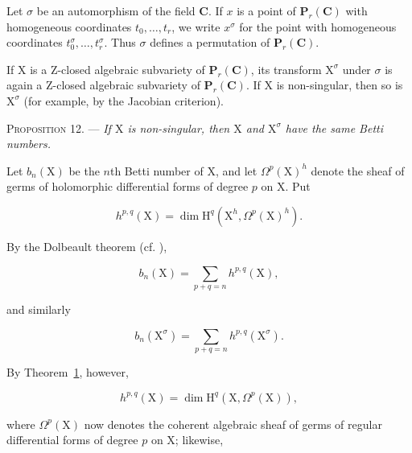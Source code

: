 

Let $\sigma$ be an automorphism of the field $\mathbf{C}$. If $x$ is a point of
$\mathbf{P}_r(\mathbf{C})$ with homogeneous coordinates $t_0,\ldots,t_r$, we
write $x^\sigma$ for the point with homogeneous coordinates
$t_0^\sigma,\ldots,t_r^\sigma$. Thus $\sigma$ defines a permutation of
$\mathbf{P}_r(\mathbf{C})$.

If $\mathrm{X}$ is a Z-closed algebraic subvariety of $\mathbf{P}_r(\mathbf{C})$, its
transform $\mathrm{X}^\sigma$ under $\sigma$ is again a Z-closed algebraic subvariety of
$\mathbf{P}_r(\mathbf{C})$. If $\mathrm{X}$ is non-singular, then so is $\mathrm{X}^\sigma$ (for
example, by the Jacobian criterion).

\textsc{Proposition 12}. --- \emph{If $\mathrm{X}$ is
non-singular, then $\mathrm{X}$ and $\mathrm{X}^\sigma$ have the same Betti numbers.}

Let $b_n(\mathrm{X})$ be the $n$th Betti number of $\mathrm{X}$, and let $\Omega^p(\mathrm{X})^h$ denote
the sheaf of germs of holomorphic differential forms of degree $p$ on $\mathrm{X}$.
Put

\begin{equation*}
h^{p,q}(\mathrm{X})=\dim\mathrm{H}^q(\mathrm{X}^h,\Omega^p(\mathrm{X})^h).
\end{equation*}

By the Dolbeault theorem (cf. ),

\begin{equation*}
b_n(\mathrm{X})=\sum_{p+q=n}h^{p,q}(\mathrm{X}),
\end{equation*}

and similarly

\begin{equation*}
b_n(\mathrm{X}^\sigma)=\sum_{p+q=n}h^{p,q}(\mathrm{X}^\sigma).
\end{equation*}

By Theorem~\hyperref[gaga:thm:1]{1}, however,

\begin{equation*}
h^{p,q}(\mathrm{X})=\dim\mathrm{H}^q(\mathrm{X},\Omega^p(\mathrm{X})),
\end{equation*}

where $\Omega^p(\mathrm{X})$ now denotes the coherent algebraic sheaf of germs of
regular differential forms of degree $p$ on $\mathrm{X}$; likewise,


